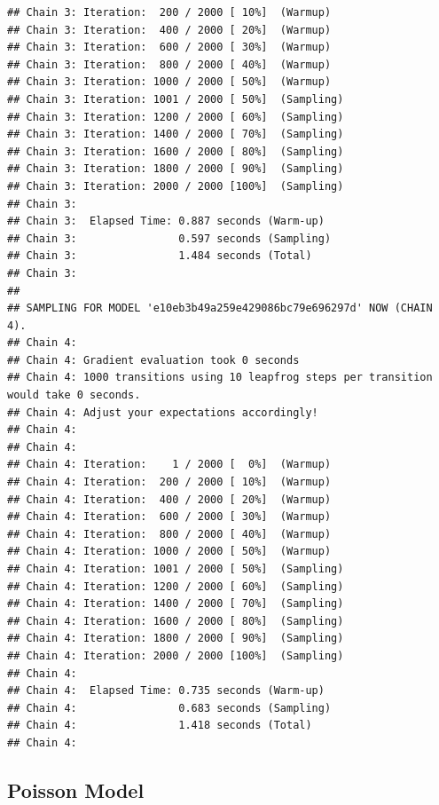 \documentclass[]{article}
\begin{document}
\begin{verbatim}
## Chain 3: Iteration:  200 / 2000 [ 10%]  (Warmup)
## Chain 3: Iteration:  400 / 2000 [ 20%]  (Warmup)
## Chain 3: Iteration:  600 / 2000 [ 30%]  (Warmup)
## Chain 3: Iteration:  800 / 2000 [ 40%]  (Warmup)
## Chain 3: Iteration: 1000 / 2000 [ 50%]  (Warmup)
## Chain 3: Iteration: 1001 / 2000 [ 50%]  (Sampling)
## Chain 3: Iteration: 1200 / 2000 [ 60%]  (Sampling)
## Chain 3: Iteration: 1400 / 2000 [ 70%]  (Sampling)
## Chain 3: Iteration: 1600 / 2000 [ 80%]  (Sampling)
## Chain 3: Iteration: 1800 / 2000 [ 90%]  (Sampling)
## Chain 3: Iteration: 2000 / 2000 [100%]  (Sampling)
## Chain 3: 
## Chain 3:  Elapsed Time: 0.887 seconds (Warm-up)
## Chain 3:                0.597 seconds (Sampling)
## Chain 3:                1.484 seconds (Total)
## Chain 3: 
## 
## SAMPLING FOR MODEL 'e10eb3b49a259e429086bc79e696297d' NOW (CHAIN 4).
## Chain 4: 
## Chain 4: Gradient evaluation took 0 seconds
## Chain 4: 1000 transitions using 10 leapfrog steps per transition would take 0 seconds.
## Chain 4: Adjust your expectations accordingly!
## Chain 4: 
## Chain 4: 
## Chain 4: Iteration:    1 / 2000 [  0%]  (Warmup)
## Chain 4: Iteration:  200 / 2000 [ 10%]  (Warmup)
## Chain 4: Iteration:  400 / 2000 [ 20%]  (Warmup)
## Chain 4: Iteration:  600 / 2000 [ 30%]  (Warmup)
## Chain 4: Iteration:  800 / 2000 [ 40%]  (Warmup)
## Chain 4: Iteration: 1000 / 2000 [ 50%]  (Warmup)
## Chain 4: Iteration: 1001 / 2000 [ 50%]  (Sampling)
## Chain 4: Iteration: 1200 / 2000 [ 60%]  (Sampling)
## Chain 4: Iteration: 1400 / 2000 [ 70%]  (Sampling)
## Chain 4: Iteration: 1600 / 2000 [ 80%]  (Sampling)
## Chain 4: Iteration: 1800 / 2000 [ 90%]  (Sampling)
## Chain 4: Iteration: 2000 / 2000 [100%]  (Sampling)
## Chain 4: 
## Chain 4:  Elapsed Time: 0.735 seconds (Warm-up)
## Chain 4:                0.683 seconds (Sampling)
## Chain 4:                1.418 seconds (Total)
## Chain 4:
\end{verbatim}

\hypertarget{poisson-model}{%
\subsection{Poisson Model}\label{poisson-model}}
\end{document}
